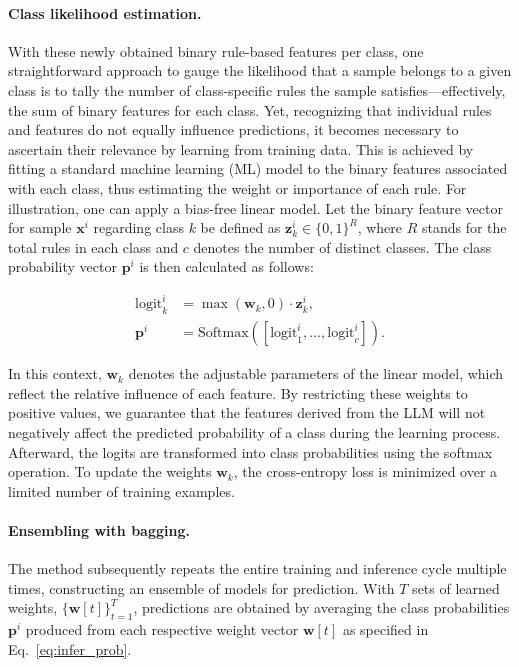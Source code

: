 \paragraph{Class likelihood estimation.} With these newly obtained binary rule-based features per class, one straightforward approach to gauge the likelihood that a sample belongs to a given class is to tally the number of class-specific rules the sample satisfies—effectively, the sum of binary features for each class. Yet, recognizing that individual rules and features do not equally influence predictions, it becomes necessary to ascertain their relevance by learning from training data. This is achieved by fitting a standard machine learning (ML) model to the binary features associated with each class, thus estimating the weight or importance of each rule. For illustration, one can apply a bias-free linear model. Let the binary feature vector for sample $\mathbf{x}^i$ regarding class $k$ be defined as $\mathbf{z}_k^i \in \{0, 1\}^R$, where $R$ stands for the total rules in each class and $c$ denotes the number of distinct classes. The class probability vector $\mathbf{p}^i$ is then calculated as follows:

\begin{align}
\text{logit}_k^i &= \max(\mathbf{w}_k, 0) \cdot \mathbf{z}_k^i, \nonumber \\
\mathbf{p}^i &= \text{Softmax}({[\text{logit}_{1}^i, ..., \text{logit}_{c}^i]}). \label{eq:infer_prob}
\end{align}

In this context, $\mathbf{w}_k$ denotes the adjustable parameters of the linear model, which reflect the relative influence of each feature. By restricting these weights to positive values, we guarantee that the features derived from the LLM will not negatively affect the predicted probability of a class during the learning process. Afterward, the logits are transformed into class probabilities using the softmax operation. To update the weights $\mathbf{w}_k$, the cross-entropy loss is minimized over a limited number of training examples.

\vspace*{-0.12in}
\paragraph{Ensembling with bagging.} The method subsequently repeats the entire training and inference cycle multiple times, constructing an ensemble of models for prediction. With $T$ sets of learned weights, $\{\mathbf{w}[t]\}_{t=1}^T$, predictions are obtained by averaging the class probabilities $\mathbf{p}^i$ produced from each respective weight vector $\mathbf{w}[t]$ as specified in Eq.~\ref{eq:infer_prob}.

